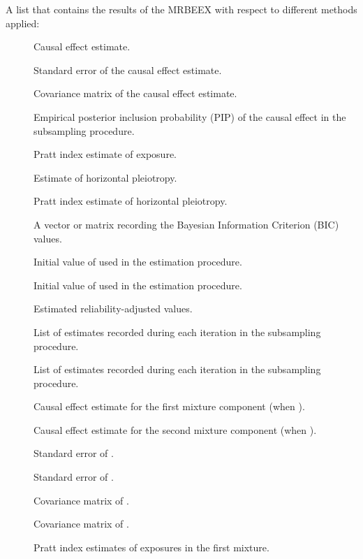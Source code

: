 \documentclass[a4paper]{book}
\begin{document}
\begin{Value}
A list that contains the results of the MRBEEX with respect to different methods applied:
\begin{description}

\item[] Causal effect estimate.
\item[] Standard error of the causal effect estimate.
\item[] Covariance matrix of the causal effect estimate.
\item[] Empirical posterior inclusion probability (PIP) of the causal effect in the subsampling procedure.
\item[] Pratt index estimate of exposure.
\item[] Estimate of horizontal pleiotropy.
\item[] Pratt index estimate of horizontal pleiotropy.
\item[] A vector or matrix recording the Bayesian Information Criterion (BIC) values.
\item[] Initial value of  used in the estimation procedure.
\item[] Initial value of  used in the estimation procedure.
\item[] Estimated reliability-adjusted values.
\item[] List of  estimates recorded during each iteration in the subsampling procedure.
\item[] List of  estimates recorded during each iteration in the subsampling procedure.
\item[] Causal effect estimate for the first mixture component (when ).
\item[] Causal effect estimate for the second mixture component (when ).
\item[] Standard error of .
\item[] Standard error of .
\item[] Covariance matrix of .
\item[] Covariance matrix of .
\item[] Pratt index estimates of exposures in the first mixture.

\end{description}
\end{Value}
\end{document}
